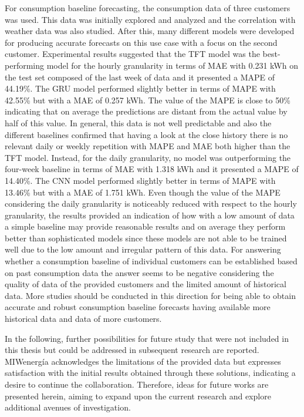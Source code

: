 For consumption baseline forecasting, the consumption data of three customers was used.
This data was initially explored and analyzed and the correlation with weather data was also studied.
After this, many different models were developed for producing accurate forecasts on this use case with a focus on the second customer.
Experimental results suggested that the TFT model was the best-performing model for the hourly granularity in terms of MAE with 0.231 kWh on the test set composed of the last week of data and it presented a MAPE of 44.19\%.
The GRU model performed slightly better in terms of MAPE with 42.55\% but with a MAE of 0.257 kWh.
The value of the MAPE is close to 50\% indicating that on average the predictions are distant from the actual value by half of this value.
In general, this data is not well predictable and also the different baselines confirmed that having a look at the close history there is no relevant daily or weekly repetition with MAPE and MAE both higher than the TFT model.
Instead, for the daily granularity, no model was outperforming the four-week baseline in terms of MAE with 1.318 kWh and it presented a MAPE of 14.40\%.
The CNN model performed slightly better in terms of MAPE with 13.46\% but with a MAE of 1.751 kWh.
Even though the value of the MAPE considering the daily granularity is noticeably reduced with respect to the hourly granularity, the results provided an indication of how with a low amount of data a simple baseline may provide reasonable results and on average they perform better than sophisticated models since these models are not able to be trained well due to the low amount and irregular pattern of this data.
For answering whether a consumption baseline of individual customers can be established based on past consumption data the answer seems to be negative considering the quality of data of the provided customers and the limited amount of historical data.
More studies should be conducted in this direction for being able to obtain accurate and robust consumption baseline forecasts having available more historical data and data of more customers.

In the following, further possibilities for future study that were not included in this thesis but could be addressed in subsequent research are reported.
MIWenergía acknowledges the limitations of the provided data but expresses satisfaction with the initial results obtained through these solutions, indicating a desire to continue the collaboration.
Therefore, ideas for future works are presented herein, aiming to expand upon the current research and explore additional avenues of investigation.

